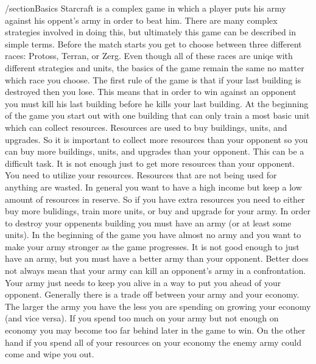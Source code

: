 /section{Basics}
Starcraft is a complex game in which a player puts his army against his oppent's army in order to beat him. There are many complex strategies involved in doing this, but ultimately this game can be described in simple terms.
Before the match starts you get to choose between three different races: Protoss, Terran, or Zerg. Even though all of these races are uniqe with different strategies and units, the basics of the game remain the same no matter which race you choose.
The first rule of the game is that if your last building is destroyed then you lose. This means that in order to win against an opponent you must kill his last building before he kills your last building. 
At the beginning of the game you start out with one building that can only train a most basic unit which can collect resources. Resources are used to buy buildings, units, and upgrades. So it is important to collect more resources than your opponent so you can buy more buildings, units, and upgrades than your opponent.
This can be a difficult task. It is not enough just to get more resources than your opponent. You need to utilize your resources. Resources that are not being used for anything are wasted. In general you want to have a high income but keep a low amount of resources in reserve. So if you have extra resources you need to either buy more bulidings, train more units, or buy and upgrade for your army.
In order to destroy your oppenents building you must have an army (or at least some units). In the beginning of the game you have almost no army and you want to make your army stronger as the game progresses. It is not good enough to just have an army, but you must have a better army than your opponent. Better does not always mean that your army can kill an opponent's army in a confrontation. Your army just needs to keep you alive in a way to put you ahead of your opponent.
Generally there is a trade off between your army and your economy. The larger the army you have the less you are spending on growing your economy (and vice versa). If you spend too much on your army but not enough on economy you may become too far behind later in the game to win. On the other hand if you spend all of your resources on your economy the enemy army could come and wipe you out.

 